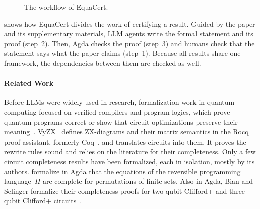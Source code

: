 \documentclass[acmsmall,screen,nonacm]{acmart}
\begin{document}
\begin{figure}[!htb]
\centering
\resizebox{\linewidth}{!}{}
\caption{The workflow of EquaCert.}
\label{fig:equacert-pipeline}
\end{figure}

 shows how EquaCert divides the work of
certifying a result. Guided by the paper and its supplementary materials, LLM agents write the formal statement and its proof (step~2). Then, Agda checks the proof (step~3) and humans check that the statement says what the paper claims (step~1). Because all results share one framework, the dependencies between them are checked as well.


\paragraph{Related Work}
Before LLMs were widely used in research, formalization work in quantum computing focused on verified compilers and program logics, which prove quantum programs correct or show that circuit optimizations preserve their meaning~\cite{paykin2017qwire,hietala2021voqc,chareton2021qbricks,zhou2023coqq}. VyZX~\cite{lehmann2026vyzx} defines ZX-diagrams and their matrix semantics in the Rocq proof assistant, formerly Coq~\cite{bertot2004coqart,rocq2025prover}, and translates circuits into them. It proves the rewrite rules sound and relies on the literature for their completeness. 
Only a few circuit completeness results have been formalized, each in isolation, mostly by its authors. \citet{choudhury2022symmetries} formalize in Agda that the equations of the reversible programming language~$\Pi$ are complete for permutations of finite sets. Also in Agda, Bian and Selinger formalize their completeness proofs for two-qubit Clifford+\T{} and three-qubit Clifford+\CS{} circuits~\cite{bian2023cliffordt2,bian2023cliffordcs3}.
\end{document}
